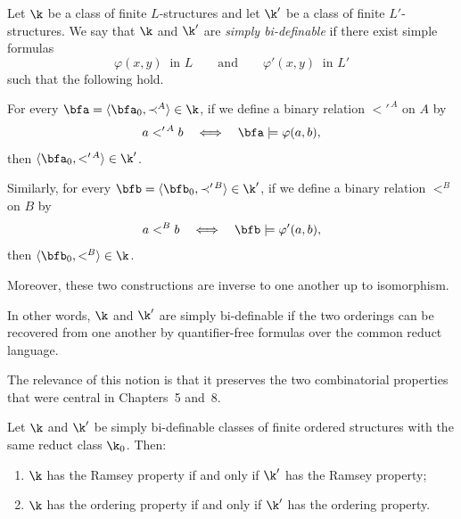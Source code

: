 \begin{definition}
    \label{def:simple-bi-definability}
    Let $\k$ be a class of finite $L$-structures and let $\k'$ be a class of finite $L'$-structures. We say that $\k$ and $\k'$ are \emph{simply bi-definable} if there exist simple formulas
    \[
        \varphi(x,y)\ \text{ in } L
        \qquad\text{and}\qquad
        \varphi'(x,y)\ \text{ in } L'
    \]
    such that the following hold.

    For every \(\bfa=\langle \bfa_0,\prec^A\rangle\in \k\),
    if we define a binary relation $<'^{\,A}$ on $A$ by
    \[
        a<'^{\,A} b
        \quad\Longleftrightarrow\quad
        \bfa\models \varphi(a,b),
    \]
    then \(\langle \bfa_0,<'^{\,A}\rangle\in \k'\).

    Similarly, for every
    \(\bfb=\langle \bfb_0,\prec'^{\,B}\rangle\in \k'\),
    if we define a binary relation $<^{B}$ on $B$ by
    \[
        a<^{B} b
        \quad\Longleftrightarrow\quad
        \bfb\models \varphi'(a,b),
    \]
    then \(\langle \bfb_0,<^{B}\rangle\in \k\).

    Moreover, these two constructions are inverse to one another up to isomorphism.
\end{definition}

In other words, $\k$ and $\k'$ are simply bi-definable if the two orderings can be recovered from one another by quantifier-free formulas over the common reduct language.

The relevance of this notion is that it preserves the two combinatorial properties that were central in Chapters~5 and~8.

\begin{proposition}
    \label{prop:simple-bi-definability-preserves-properties}
    Let $\k$ and $\k'$ be simply bi-definable classes of finite ordered structures with the same reduct class $\k_0$. Then:
    \begin{enumerate}
        \item[(i)] $\k$ has the Ramsey property if and only if $\k'$ has the Ramsey property;
        \item[(ii)] $\k$ has the ordering property if and only if $\k'$ has the ordering property.
    \end{enumerate}
\end{proposition}

